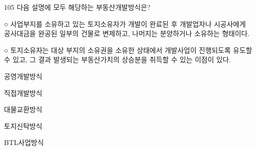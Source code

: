 \begin{question}{105}
다음 설명에 모두 해당하는 부동산개발방식은?
\begin{framedtext}
○ 사업부지를 소유하고 있는 토지소유자가 개발이 완료된 후 개발업자나 시공사에게 공사대금을 완공된 일부의 건물로 변제하고, 나머지는 분양하거나 소유하는 형태이다. \par
○ 토지소유자는 대상 부지의 소유권을 소유한 상태에서 개발사업이 진행되도록 유도할 수 있고, 그 결과 발생되는 부동산가치의 상승분을 취득할 수 있는 이점이 있다. \par
\end{framedtext}
\begin{choices}
  \item 공영개발방식
  \item 직접개발방식
  \item 대물교환방식
  \item 토지신탁방식
  \item BTL사업방식
\end{choices}
\end{question}

